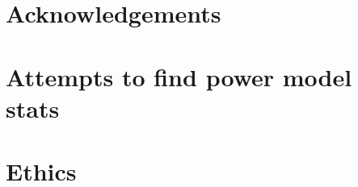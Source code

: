 \documentclass[12pt]{report}
\begin{document}
    \chapter*{Acknowledgements}
    
    
    \printbibliography
    
    \appendix
    
    \chapter{Attempts to find power model stats}\label{ch:power-model-eldritch}
    
    
    \chapter{Ethics}
    
\end{document}
